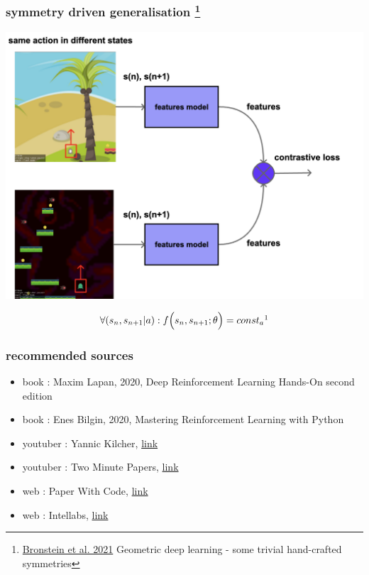 \documentclass{beamer}
\begin{document}
\begin{frame}
  
  \frametitle{symmetry driven generalisation \footnote{\href{https://geometricdeeplearning.com/lectures/}{Bronstein et al. 2021} Geometric deep learning - some trivial hand-crafted symmetries} }

  \centering
  \includegraphics[scale=0.15]{../diagrams/symmetry/basic.png}

  \begin{align*}
    \forall (s_{n},s_{n+1} \vert a) : f \Big( s_{n}, s_{n+1}; \theta \Big) = const_a \footnotemark
  \end{align*} 
 
\end{frame}


\begin{frame}
  
  \frametitle{recommended sources}

  \begin{itemize}
    \item book : Maxim Lapan, 2020, Deep Reinforcement Learning Hands-On second edition
    \item book : Enes Bilgin, 2020, Mastering Reinforcement Learning with Python
    \item youtuber : Yannic Kilcher, \href{https://www.youtube.com/c/YannicKilcher/videos}{link}
    \item youtuber : Two Minute Papers, \href{https://www.youtube.com/c/KárolyZsolnai/videos}{link}
    \item web : Paper With Code, \href{https://paperswithcode.com/methods/category/policy-gradient-methods}{link}
    \item web : Intellabs, \href{https://intellabs.github.io/coach/components/agents/index.html}{link}
  \end{itemize}
    
\end{frame}
\end{document}
